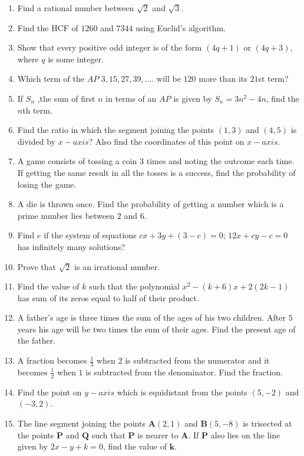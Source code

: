 \documentclass[12pt,-letter paper]{article}
\let\vec\mathbf{}
\let\vec\mathbf{}
\let\vec\mathbf{}
\providecommand{\brak}[1]{\ensuremath{\left(#1\right)}}\graphicspath{{/storage/self/primary/Download/latexnew/fig}}
\begin{document}
\begin{enumerate}
\begin{figure}[H]
			
		\end{figure}  
\item Find a rational number between $\sqrt{2}$ and $\sqrt{3}$.
\item Find the HCF of $1260$ and $7344$ using Euclid's algorithm.
\item Show that every positive odd integer is of the form $\brak{4q+1}$ or $\brak{4q+3}$, where $q$ is some integer.
\item Which term of the $AP$ $3, 15, 27, 39, ....$ will be $120$ more than its $21$st term?
\item If $S_n$ ,the sum of first $n$ in terms of an $AP$ is given by $S_n=3n^2-4n$, find the $n$th term.
\item Find the ratio in which the segment joining the points $\brak{1, 3}$ and $\brak{4, 5}$ is divided by $x-axis$? Also find the coordinates of this point on
 $x-axis$.
\item A game consists of tossing a coin $3$ times and noting the outcome each time. If getting the same result in all the tosses is a success, find the probability of losing the game.
\item A die is thrown once. Find the probability of getting a number which {}  is a prime number {} lies between $2$ and $6$.
\item Find $e$ if the system of equations $cx+3y+(3-c)=0$; $12x+cy-c=0$ has infinitely many solutions?
\item Prove that $\sqrt{2}$ is an irrational number.
\item Find the value of $k$ such that the polynomial $ x^2-\brak{k+6}x+2\brak{2k-1}$ has sum of its zeros equal to half of their product.
\item A father's age is three times the sum of the ages of his two children. After $5$ years his age will be two times the sum of their ages. Find the present age of the father.
\item A fraction becomes $\frac{1}{3}$ when $2$ is subtracted from the numerator and it becomes $\frac{1}{2}$ when $1$ is subtracted from the denominator. Find the fraction.
\item Find the point on $y-axis$ which is equidistant from the points $\brak{5, -2}$ and $\brak{-3, 2}$.
\item The line segment joining the points $\vec{A}\brak{2, 1}$ and $\vec{B}\brak{5, -8}$ is trisected at the points $\vec{P}$ and $\vec{Q}$ such that $\vec{P}$ is nearer to $\vec{A}$. If $\vec{P}$ also lies on the line given by $2x-y+k=0$, find the value of $\vec{k}$.

\end{enumerate}
\end{document}
